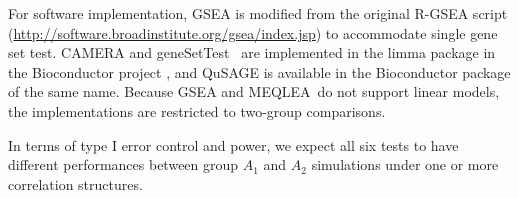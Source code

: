 \documentclass[useAMS,usenatbib, galley]{biom}
\newcommand{\OurMethod}{MEQLEA}
\newcommand{\HowmanyTest}{six}
\newcommand{\CMR}{CAMERA-rank}
\newcommand{\CMT}{CAMERA-modt}
\newcommand{\gent}{geneSetTest-modt}
\newcommand{\gen}{geneSetTest}
\begin{document}
		
		For software implementation, GSEA is modified from the original R-GSEA script (\url{http://software.broadinstitute.org/gsea/index.jsp}) to accommodate single gene set test. CAMERA and \gen~ are implemented  in the limma package \citep{smyth2005limma} in the Bioconductor project \citep{gentleman2004bioconductor}, and QuSAGE is available in the Bioconductor package of the same name. Because GSEA and \OurMethod~do not support linear models, the implementations are restricted to two-group comparisons.
		
		
		
		In terms of type I error control and power, we expect all six tests to have different performances between group $A_1$ and $A_2$ simulations under one or more correlation structures. 
		 
\end{document}
